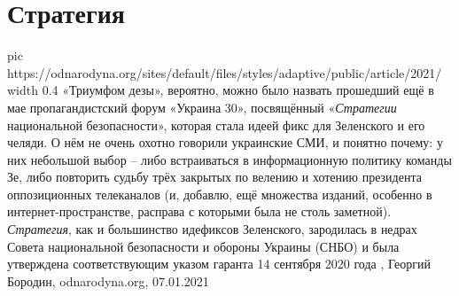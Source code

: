  
 
 
 
 
\chapter{Стратегия}
\label{sec:slova.strategia}

\ifcmt
  pic https://odnarodyna.org/sites/default/files/styles/adaptive/public/article/2021/%
	width 0.4
\fi
«Триумфом дезы», вероятно, можно было назвать прошедший ещё в мае
пропагандистский форум «Украина 30», посвящённый «\emph{Стратегии} национальной
безопасности», которая стала идеей фикс для Зеленского и его челяди. О нём не
очень охотно говорили украинские СМИ, и понятно почему: у них небольшой выбор –
либо встраиваться в информационную политику команды Зе, либо повторить судьбу
трёх закрытых по велению и хотению президента оппозиционных телеканалов (и,
добавлю, ещё множества изданий, особенно в интернет-пространстве, расправа с
которыми была не столь заметной).  \emph{Стратегия}, как и большинство
идефиксов Зеленского, зародилась в недрах Совета национальной безопасности и
обороны Украины (СНБО) и была утверждена соответствующим указом гаранта 14
сентября 2020 года
, Георгий Бородин, odnarodyna.org, 07.01.2021
